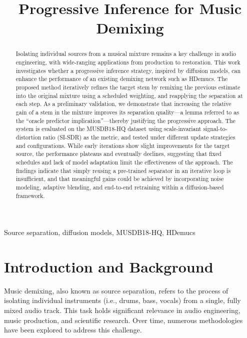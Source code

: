 \documentclass{article}
\title{Progressive Inference for Music Demixing}
\begin{document}
\ninept
\maketitle

\begin{sloppy}

\begin{abstract}

Isolating individual sources from a musical mixture remains a key challenge in audio engineering, with wide-ranging applications from production to restoration. This work investigates whether a progressive inference strategy, inspired by diffusion models, can enhance the performance of an existing demixing network such as HDemucs. The proposed method iteratively refines the target stem by remixing the previous estimate into the original mixture using a scheduled weighting, and reapplying the separation at each step. As a preliminary validation, we demonstrate that increasing the relative gain of a stem in the mixture improves its separation quality—a lemma referred to as the “oracle predictor implication”—thereby justifying the progressive approach. The system is evaluated on the MUSDB18-HQ dataset using scale-invariant signal-to-distortion ratio (SI-SDR) as the metric, and tested under different update strategies and configurations. While early iterations show slight improvements for the target source, the performance plateaus and eventually declines, suggesting that fixed schedules and lack of model adaptation limit the effectiveness of the approach. The findings indicate that simply reusing a pre-trained separator in an iterative loop is insufficient, and that meaningful gains could be achieved by incorporating noise modeling, adaptive blending, and end-to-end retraining within a diffusion-based framework.

\end{abstract}

\begin{keywords}
Source separation, diffusion models, MUSDB18-HQ, HDemucs
\end{keywords}

\section{Introduction and Background}
\label{sec:intro}

Music demixing, also known as source separation, refers to the process of isolating individual instruments (i.e., drums, bass, vocals) from a single, fully mixed audio track. This task holds significant relevance in audio engineering, music production, and scientific research. Over time, numerous methodologies have been explored to address this challenge.


\end{sloppy}
\end{document}
